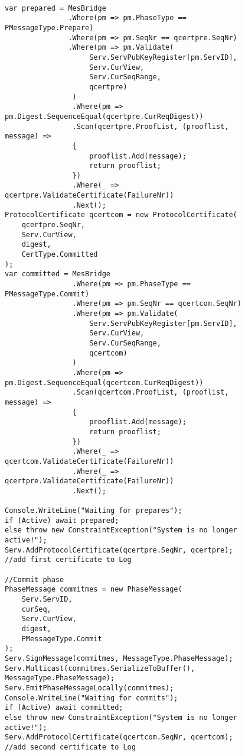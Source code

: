 \begin{figure}[H]
	\centering
	\begin{lstlisting}[label = code:PrepareAndCommit, caption= Prepare and Commit phase, captionpos = b, basicstyle=\scriptsize]
	
var prepared = MesBridge
               .Where(pm => pm.PhaseType == PMessageType.Prepare)
               .Where(pm => pm.SeqNr == qcertpre.SeqNr)
               .Where(pm => pm.Validate(
                    Serv.ServPubKeyRegister[pm.ServID], 
                    Serv.CurView, 
                    Serv.CurSeqRange, 
                    qcertpre)
                )
                .Where(pm => pm.Digest.SequenceEqual(qcertpre.CurReqDigest))
                .Scan(qcertpre.ProofList, (prooflist, message) =>
                {
                    prooflist.Add(message);
                    return prooflist;
                })
                .Where(_ => qcertpre.ValidateCertificate(FailureNr))
                .Next();
ProtocolCertificate qcertcom = new ProtocolCertificate(
    qcertpre.SeqNr, 
    Serv.CurView, 
    digest, 
    CertType.Committed
);   
var committed = MesBridge
                .Where(pm => pm.PhaseType == PMessageType.Commit)
                .Where(pm => pm.SeqNr == qcertcom.SeqNr)
                .Where(pm => pm.Validate(
                    Serv.ServPubKeyRegister[pm.ServID], 
                    Serv.CurView, 
                    Serv.CurSeqRange, 
                    qcertcom)
                )
                .Where(pm => pm.Digest.SequenceEqual(qcertcom.CurReqDigest))
                .Scan(qcertcom.ProofList, (prooflist, message) =>
                {
                    prooflist.Add(message);
                    return prooflist;
                })
                .Where(_ => qcertcom.ValidateCertificate(FailureNr))
                .Where(_ => qcertpre.ValidateCertificate(FailureNr))
                .Next();
                
Console.WriteLine("Waiting for prepares");
if (Active) await prepared;
else throw new ConstraintException("System is no longer active!");
Serv.AddProtocolCertificate(qcertpre.SeqNr, qcertpre); //add first certificate to Log

//Commit phase
PhaseMessage commitmes = new PhaseMessage(
    Serv.ServID, 
    curSeq, 
    Serv.CurView, 
   	digest, 
    PMessageType.Commit
);
Serv.SignMessage(commitmes, MessageType.PhaseMessage);
Serv.Multicast(commitmes.SerializeToBuffer(), MessageType.PhaseMessage);
Serv.EmitPhaseMessageLocally(commitmes);
Console.WriteLine("Waiting for commits");
if (Active) await committed;
else throw new ConstraintException("System is no longer active!");
Serv.AddProtocolCertificate(qcertcom.SeqNr, qcertcom); //add second certificate to Log
	\end{lstlisting}
\end{figure}

